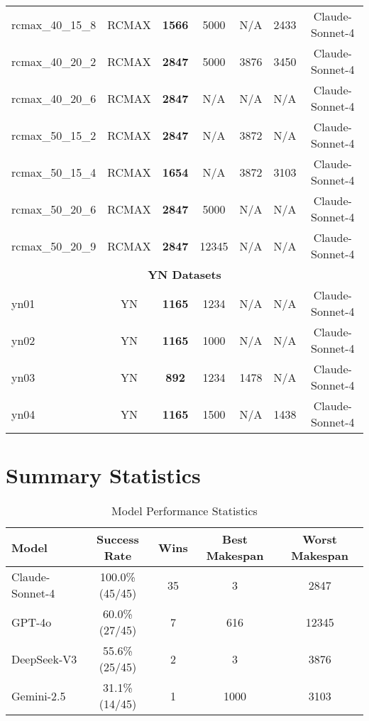 \documentclass{article}
\begin{document}
\begin{table}[h!]
{\begin{tabular}{@{}lcccccc@{}}
rcmax\_40\_15\_8 & RCMAX & \textbf{1566} & 5000 & N/A & 2433 & Claude-Sonnet-4 \\
rcmax\_40\_20\_2 & RCMAX & \textbf{2847} & 5000 & 3876 & 3450 & Claude-Sonnet-4 \\
rcmax\_40\_20\_6 & RCMAX & \textbf{2847} & N/A & N/A & N/A & Claude-Sonnet-4 \\
rcmax\_50\_15\_2 & RCMAX & \textbf{2847} & N/A & 3872 & N/A & Claude-Sonnet-4 \\
rcmax\_50\_15\_4 & RCMAX & \textbf{1654} & N/A & 3872 & 3103 & Claude-Sonnet-4 \\
rcmax\_50\_20\_6 & RCMAX & \textbf{2847} & 5000 & N/A & N/A & Claude-Sonnet-4 \\
rcmax\_50\_20\_9 & RCMAX & \textbf{2847} & 12345 & N/A & N/A & Claude-Sonnet-4 \\
\midrule
\multicolumn{7}{c}{\textbf{YN Datasets}} \\
yn01 & YN & \textbf{1165} & 1234 & N/A & N/A & Claude-Sonnet-4 \\
yn02 & YN & \textbf{1165} & 1000 & N/A & N/A & Claude-Sonnet-4 \\
yn03 & YN & \textbf{892} & 1234 & 1478 & N/A & Claude-Sonnet-4 \\
yn04 & YN & \textbf{1165} & 1500 & N/A & 1438 & Claude-Sonnet-4 \\
\bottomrule
\end{tabular}%
}
\end{table}

\section{Summary Statistics}

\begin{table}[h!]
\centering
\caption{Model Performance Statistics}
\begin{tabular}{@{}lcccc@{}}
\toprule
\textbf{Model} & \textbf{Success Rate} & \textbf{Wins} & \textbf{Best Makespan} & \textbf{Worst Makespan} \\
\midrule
Claude-Sonnet-4 & 100.0\% (45/45) & 35 & 3 & 2847 \\
GPT-4o & 60.0\% (27/45) & 7 & 616 & 12345 \\
DeepSeek-V3 & 55.6\% (25/45) & 2 & 3 & 3876 \\
Gemini-2.5 & 31.1\% (14/45) & 1 & 1000 & 3103 \\
\bottomrule
\end{tabular}
\end{table}
\end{document}
